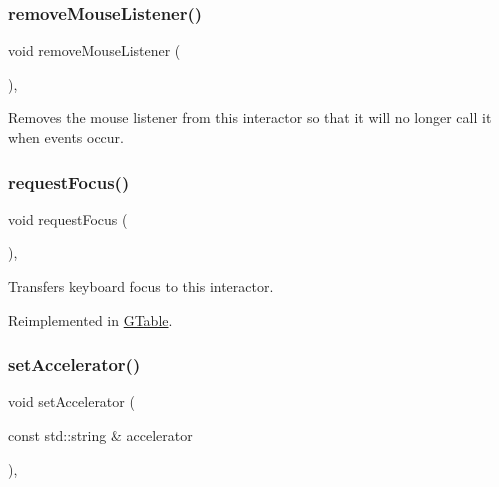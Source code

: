 \subsubsection{\texorpdfstring{remove\+Mouse\+Listener()}{removeMouseListener()}}
{\footnotesize\ttfamily void remove\+Mouse\+Listener (\begin{DoxyParamCaption}{ }\end{DoxyParamCaption})\hspace{0.3cm}{\ttfamily [virtual]}, {\ttfamily [inherited]}}



Removes the mouse listener from this interactor so that it will no longer call it when events occur. 

\mbox{\label{classGInteractor_a519fb2ac767f8b2febbb50b898b8c8cb}} 
\subsubsection{\texorpdfstring{request\+Focus()}{requestFocus()}}
{\footnotesize\ttfamily void request\+Focus (\begin{DoxyParamCaption}{ }\end{DoxyParamCaption})\hspace{0.3cm}{\ttfamily [virtual]}, {\ttfamily [inherited]}}



Transfers keyboard focus to this interactor. 



Reimplemented in \mbox{\hyperlink{classGTable_a5921efd0a5a83eacebdadb749fb3ea7a}{G\+Table}}.

\mbox{\label{classGInteractor_ad15f102f62e2960576012f1aa0ba4b2e}} 
\subsubsection{\texorpdfstring{set\+Accelerator()}{setAccelerator()}}
{\footnotesize\ttfamily void set\+Accelerator (\begin{DoxyParamCaption}\item[{const std\+::string \&}]{accelerator }\end{DoxyParamCaption})\hspace{0.3cm}{\ttfamily [virtual]}, {\ttfamily [inherited]}}



